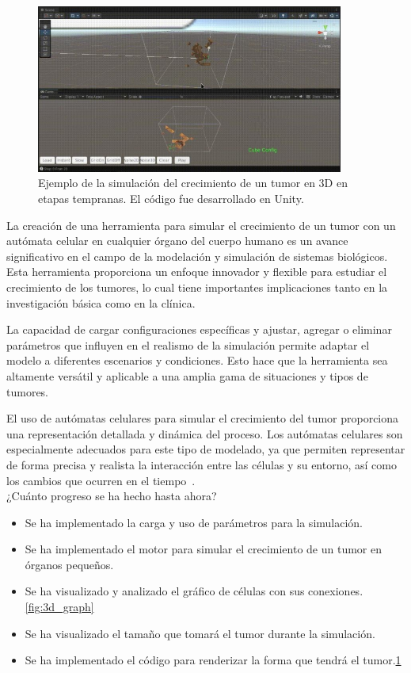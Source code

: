 \documentclass[a4paper,11pt]{article}
\begin{document}
{\begin{figure}[h]
  \centering
  \includegraphics[width=0.9\textwidth]{tumor.jpg}
  \caption{Ejemplo de la simulaci\'on del crecimiento de un tumor en 3D en etapas tempranas. El c\'odigo fue desarrollado en Unity.}
  \label{fig:tumor}
\end{figure}

La creación de una herramienta para simular el crecimiento de un tumor con un autómata celular en cualquier órgano del cuerpo humano es un avance significativo en el campo de la modelación y simulación de sistemas biológicos. Esta herramienta proporciona un enfoque innovador y flexible para estudiar el crecimiento de los tumores, lo cual tiene importantes implicaciones tanto en la investigación básica como en la clínica.

La capacidad de cargar configuraciones específicas y ajustar, agregar o eliminar parámetros que influyen en el realismo de la simulación permite adaptar el modelo a diferentes escenarios y condiciones. Esto hace que la herramienta sea altamente versátil y aplicable a una amplia gama de situaciones y tipos de tumores.

El uso de autómatas celulares para simular el crecimiento del tumor proporciona una representación detallada y dinámica del proceso. Los autómatas celulares son especialmente adecuados para este tipo de modelado, ya que permiten representar de forma precisa y realista la interacción entre las células y su entorno, así como los cambios que ocurren en el tiempo~\cite{2}.\\

¿Cuánto progreso se ha hecho hasta ahora?
\begin{itemize}
    \item Se ha implementado la carga y uso de parámetros para la simulación.
    \item Se ha implementado el motor para simular el crecimiento de un tumor en órganos pequeños. 
    \item Se ha visualizado y analizado el gráfico de células con sus conexiones.\ref{fig:3d_graph}
    \item Se ha visualizado el tamaño que tomará el tumor durante la simulación.
    \item Se ha implementado el código para renderizar la forma que tendrá el tumor.\ref{fig:tumor}
\end{itemize}

}
\end{document}
